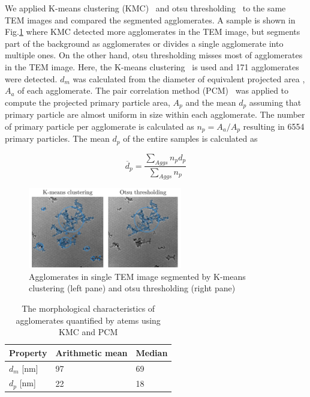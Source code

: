 We applied K-means clustering (KMC)~\citep{sipkens2021using} and otsu thresholding~\citep{dastanpour2016automated} to the same TEM images and compared the segmented agglomerates. A sample is shown in Fig.\ref{fig:shocktubest_aggseg_compare} where  KMC detected more agglomerates in the TEM image, but segments part of the background as agglomerates or divides a single agglomerate into multiple ones. On the other hand, otsu thresholding misses most of agglomerates in the TEM image. Here, the  K-means clustering~\citep{sipkens2021using} is used and 171 agglomerates were detected. $d_m$ was calculated from the diameter of equivalent projected area , $A_a$ of each agglomerate. The pair correlation method (PCM)~\citep{dastanpour2016automated} was applied to compute the projected primary particle area, $A_p$ and the mean $d_p$ assuming that primary particle are almost uniform in size within each agglomerate. The number of primary particle per agglomerate is calculated as $n_p=A_a/A_p$ resulting in 6554 primary particles. The mean $d_p$ of the entire samples is calculated as 

\begin{equation}
	\overline{d}_{p} = \frac{\sum_{Aggs} n_p d_p}{\sum_{Aggs} n_p} 
	\label{eqn:meandp}
\end{equation}


\begin{figure}[H]
	\centering
	\includegraphics[width=0.6\textwidth]{Figures/Results/Shocktube/Stanford/TEM/aggseg_compare.pdf}
	\caption{Agglomerates in single TEM image segmented by K-means clustering (left pane) and otsu thresholding (right pane)}
	\label{fig:shocktubest_aggseg_compare} 
\end{figure}


\begin{table}
	\caption{The morphological characteristics of agglomerates quantified by atems using KMC and PCM}
	\label{tab:shocktube_TEM_morph}
	\centering
	\begin{tabular}{l l l}
		\hline
		Property & Arithmetic mean & Median \\
		\hline
		$d_m$ [nm] & 97 & 69 \\
		$d_p$ [nm] & 22 & 18 \\
		\hline
	\end{tabular}
\end{table}


